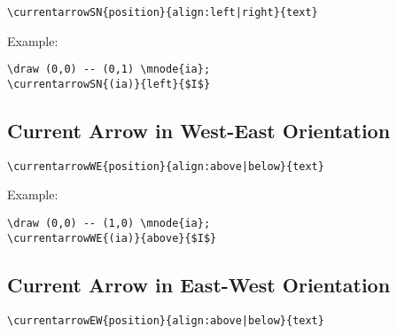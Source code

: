 \documentclass[parskip=full]{scrartcl}
\begin{document}
\begin{verbatim}
\currentarrowSN{position}{align:left|right}{text}
\end{verbatim}

Example:\\
\begin{minipage}{0.8\textwidth}
\begin{verbatim}
\draw (0,0) -- (0,1) \mnode{ia};
\currentarrowSN{(ia)}{left}{$I$}
\end{verbatim}
\end{minipage}
\begin{minipage}{0.19\textwidth}
\end{minipage}

\subsection{Current Arrow in West-East Orientation}

\begin{verbatim}
\currentarrowWE{position}{align:above|below}{text}
\end{verbatim}

Example:\\
\begin{minipage}{0.8\textwidth}
\begin{verbatim}
\draw (0,0) -- (1,0) \mnode{ia};
\currentarrowWE{(ia)}{above}{$I$}
\end{verbatim}
\end{minipage}
\begin{minipage}{0.19\textwidth}
\end{minipage}

\subsection{Current Arrow in East-West Orientation}

\begin{verbatim}
\currentarrowEW{position}{align:above|below}{text}
\end{verbatim}
\end{document}
